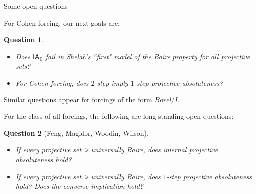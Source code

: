 \documentclass[handout, dvipsnames, usenames, 9pt, serif]{beamer}
\newtheorem{question}{Question}
\newcommand{\CC}{\mathbb{C}}
\newcommand{\IA}{\mathsf{IA}}
\newcommand{\cb}{\color{blue}}
\begin{document}
\begin{frame}{Some open questions} 


\medskip 
For Cohen forcing, our next goals are: 

\begin{question} 
\begin{itemize} 
\item 
Does {\cb $\IA_\CC$ fail} in Shelah's ``first" model of the Baire property for all projective sets? 
\smallskip 
\item 
For Cohen forcing, does $2$-step imply $1$-step projective absoluteness? 
\end{itemize} 
\end{question} 

\smallskip 
Similar questions appear for forcings of the form $Borel/I$. 
\pause  

\bigskip 
For the class of all forcings, the following are long-standing open questions: 

\begin{question}[Feng, Magidor, Woodin, Wilson] 
\begin{itemize} 
\item 
If every projective set is universally Baire, does {\cb internal} projective absoluteness hold? 
\item 
If every projective set is universally Baire, does {\cb $1$-step} projective absoluteness hold? 
Does the converse implication hold? 
\end{itemize} 
\end{question} 

\end{frame}
\end{document}
